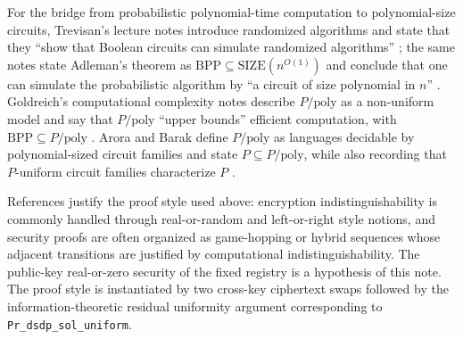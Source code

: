 \documentclass[11pt]{article}
\begin{document}
For the bridge from probabilistic polynomial-time computation to polynomial-size circuits, Trevisan's lecture notes introduce randomized algorithms and state that they ``show that Boolean circuits can simulate randomized algorithms'' \cite[Lecture~4]{trevisan-randomized-circuits}; the same notes state Adleman's theorem as $\mathrm{BPP} \subseteq \mathrm{SIZE}(n^{O(1)})$ and conclude that one can simulate the probabilistic algorithm by ``a circuit of size polynomial in $n$'' \cite[Lecture~4, Thm.~16]{trevisan-randomized-circuits}. Goldreich's computational complexity notes describe $P/\mathrm{poly}$ as a non-uniform model and say that $P/\mathrm{poly}$ ``upper bounds'' efficient computation, with $\mathrm{BPP} \subseteq P/\mathrm{poly}$ \cite[Lecture~8]{goldreich-cc-notes}. Arora and Barak define $P/\mathrm{poly}$ as languages decidable by polynomial-sized circuit families and state $P \subseteq P/\mathrm{poly}$, while also recording that $P$-uniform circuit families characterize $P$ \cite[Chap.~6]{arora-barak-circuits}.

References \cite{bellare-concrete,shoup-games,blanchet-pointcheval-games} justify the proof style used above: encryption indistinguishability is commonly handled through real-or-random and left-or-right style notions, and security proofs are often organized as game-hopping or hybrid sequences whose adjacent transitions are justified by computational indistinguishability. The public-key real-or-zero security of the fixed registry is a hypothesis of this note. The proof style is instantiated by two cross-key ciphertext swaps followed by the information-theoretic residual uniformity argument corresponding to \texttt{Pr\_dsdp\_sol\_uniform}.
\end{document}
